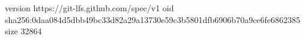 version https://git-lfs.github.com/spec/v1
oid sha256:0daa084d5dbb49bc33d82a29a13730e59c3b5801dfb6906b70a9ce6fe6862385
size 32864
